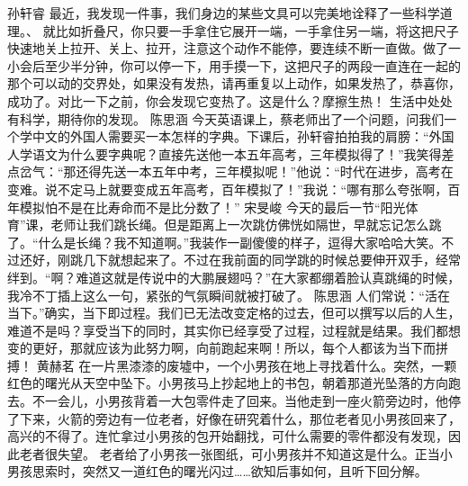 {}孙轩睿\markdownRendererInterblockSeparator
{}最近，我发现一件事，我们身边的某些文具可以完美地诠释了一些科学道理。、 就比如折叠尺，你只要一手拿住它展开一端，一手拿住另一端，将这把尺子快速地关上拉开、关上、拉开，注意这个动作不能停，要连续不断一直做。做了一小会后至少半分钟，你可以停一下，用手摸一下，这把尺子的两段一直连在一起的那个可以动的交界处，如果没有发热，请再重复以上动作，如果发热了，恭喜你，成功了。对比一下之前，你会发现它变热了。这是什么？摩擦生热！\markdownRendererInterblockSeparator
{}生活中处处有科学，期待你的发现。\markdownRendererInterblockSeparator
{}\markdownRendererInterblockSeparator
{}陈思涵\markdownRendererInterblockSeparator
{}今天英语课上，蔡老师出了一个问题，问我们一个学中文的外国人需要买一本怎样的字典。下课后，孙轩睿拍拍我的肩膀：“外国人学语文为什么要字典呢？直接先送他一本五年高考，三年模拟得了！”我笑得差点岔气：“那还得先送一本五年中考，三年模拟呢！”他说：“时代在进步，高考在变难。说不定马上就要变成五年高考，百年模拟了！”我说：“哪有那么夸张啊，百年模拟怕不是在比寿命而不是比分数了！”\markdownRendererInterblockSeparator
{}\markdownRendererInterblockSeparator
{}宋旻峻\markdownRendererInterblockSeparator
{}今天的最后一节“阳光体育”课，老师让我们跳长绳。但是距离上一次跳仿佛恍如隔世，早就忘记怎么跳了。“什么是长绳？我不知道啊。”我装作一副傻傻的样子，逗得大家哈哈大笑。不过还好，刚跳几下就想起来了。不过在我前面的同学跳的时候总要伸开双手，经常绊到。“啊？难道这就是传说中的大鹏展翅吗？”在大家都绷着脸认真跳绳的时候，我冷不丁插上这么一句，紧张的气氛瞬间就被打破了。\markdownRendererInterblockSeparator
{}\markdownRendererInterblockSeparator
{}陈思涵\markdownRendererInterblockSeparator
{}人们常说：“活在当下。”确实，当下即过程。我们已无法改变定格的过去，但可以撰写以后的人生，难道不是吗？享受当下的同时，其实你已经享受了过程，过程就是结果。我们都想变的更好，那就应该为此努力啊，向前跑起来啊！所以，每个人都该为当下而拼搏！\markdownRendererInterblockSeparator
{}\markdownRendererInterblockSeparator
{}黄赫茗\markdownRendererInterblockSeparator
{}在一片黑漆漆的废墟中，一个小男孩在地上寻找着什么。突然，一颗红色的曙光从天空中坠下。小男孩马上抄起地上的书包，朝着那道光坠落的方向跑去。不一会儿，小男孩背着一大包零件走了回来。当他走到一座火箭旁边时，他停了下来，火箭的旁边有一位老者，好像在研究着什么，那位老者见小男孩回来了，高兴的不得了。连忙拿过小男孩的包开始翻找，可什么需要的零件都没有发现，因此老者很失望。\markdownRendererInterblockSeparator
{}老者给了小男孩一张图纸，可小男孩并不知道这是什么。正当小男孩思索时，突然又一道红色的曙光闪过……欲知后事如何，且听下回分解。\markdownRendererInterblockSeparator
